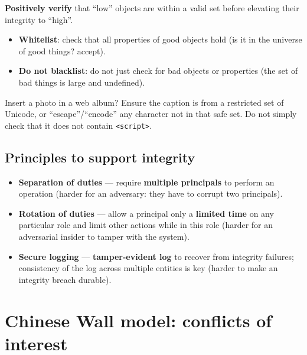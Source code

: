 \begin{propbox}[title=Fundamental principle of sanitization (fail-safe defaults)]
\textbf{Positively verify} that ``low'' objects are within a valid set before elevating
their integrity to ``high''.
\begin{itemize}
  \item \textbf{Whitelist}: check that all properties of good objects hold (is it in the
        universe of good things? accept).
  \item \textbf{Do not blacklist}: do not just check for bad objects or properties (the
        set of bad things is large and undefined).
\end{itemize}
\end{propbox}

\begin{exbox}[title=XSS]
Insert a photo in a web album? Ensure the caption is from a restricted set of Unicode, or
``escape''/``encode'' any character not in that safe set. Do not simply check that it
does not contain \texttt{<script>}.
\end{exbox}

\subsection{Principles to support integrity}

\begin{defnbox}[title=Three principles to support integrity]
\begin{itemize}
  \item \textbf{Separation of duties} --- require \textbf{multiple principals} to perform
        an operation (harder for an adversary: they have to corrupt two principals).
  \item \textbf{Rotation of duties} --- allow a principal only a \textbf{limited time} on
        any particular role and limit other actions while in this role (harder for an
        adversarial insider to tamper with the system).
  \item \textbf{Secure logging} --- \textbf{tamper-evident log} to recover from integrity
        failures; consistency of the log across multiple entities is key (harder to make
        an integrity breach durable).
\end{itemize}
\end{defnbox}

\section{Chinese Wall model: conflicts of interest}

